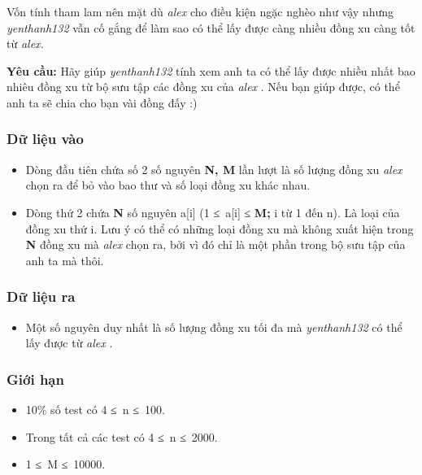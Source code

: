    Vốn tính tham lam nên mặt dù   \emph{    alex   }   cho điều kiện ngặc nghèo như vậy nhưng   \emph{    yenthanh132   }   vẫn cố gắng để làm sao có thể lấy được càng nhiều đồng xu càng tốt từ   \emph{    alex.   }

\textbf{    Yêu cầu:   }   Hãy giúp   \emph{    yenthanh132   }   tính xem anh ta có thể lấy được nhiều nhất bao nhiêu đồng xu từ bộ sưu tập các đồng xu của   \emph{    alex   }   . Nếu bạn giúp được, có thể anh ta sẽ chia cho bạn vài đồng đấy :)  

\subsubsection{   Dữ liệu vào  }
\begin{itemize}
	\item     Dòng đầu tiên chứa số 2 số nguyên    \textbf{     N, M    }    lần lượt là số lượng đồng xu    \emph{     alex    }    chọn ra để bỏ vào bao thư và số loại đồng xu khác nhau.   
	\item     Dòng thứ 2 chứa    \textbf{     N    }    số nguyên a[i] (1 ≤ a[i] ≤    \textbf{     M;    }    i từ 1 đến n). Là loại của đồng xu thứ i. Lưu ý có thể có những loại đồng xu mà không xuất hiện trong    \textbf{     N    }    đồng xu mà    \emph{     alex    }    chọn ra, bởi vì đó chỉ là một phần trong bộ sưu tập của anh ta mà thôi.   
\end{itemize}

\subsubsection{   Dữ liệu ra  }
\begin{itemize}
	\item     Một số nguyên duy nhất là số lượng đồng xu tối đa mà    \emph{     yenthanh132    }    có thể lấy được từ    \emph{     alex    }    .   
\end{itemize}

\subsubsection{   Giới hạn  }
\begin{itemize}
	\item     10\% số test có 4 ≤ n ≤ 100.   
	\item     Trong tất cả các test có 4 ≤ n ≤ 2000.   
	\item     1 ≤ M ≤ 10000.   
\end{itemize}
\begin{itemize}
\end{itemize}

